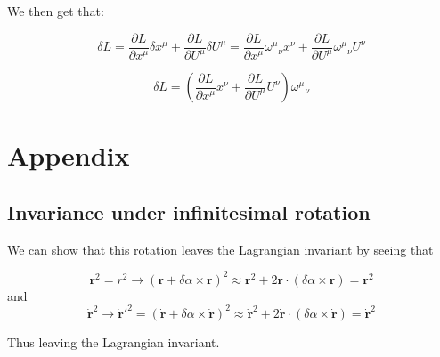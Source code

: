 \documentclass[a4paper,norsk, 10pt]{article}
\begin{document}
We then get that:

$$
\delta L = \frac{\partial L}{\partial x^{\mu}}\delta x^{\mu} + \frac{\partial L}{\partial U^{\mu}}\delta U^{\mu} = \frac{\partial L}{\partial x^{\mu}}{\omega^{\mu}}_{\nu}x^{\nu} + \frac{\partial L}{\partial U^{\mu}}{\omega^{\mu}}_{\nu}U^{\nu}
$$

\begin{equation}
\delta L = \left(\frac{\partial L}{\partial x^{\mu}}x^{\nu} + \frac{\partial L}{\partial U^{\mu}}U^{\nu}\right){\omega^{\mu}}_{\nu}
\end{equation}


\section{Appendix}

\subsection{Invariance under infinitesimal rotation}
We can show that this rotation leaves the Lagrangian invariant by seeing that

$$
\mathbf{r}^2 = r^2 \rightarrow (\mathbf{r} + \delta\alpha\times\mathbf{r})^2 \approx \mathbf{r}^2 + 2\mathbf{r}\cdot(\delta\alpha\times \mathbf{r}) = \mathbf{r}^2
$$
and
$$
\mathbf{\dot{r}}^2 \rightarrow \mathbf{\dot{r}}'^2 = (\mathbf{\dot{r}} + \delta \alpha\times \mathbf{\dot{r}})^2 \approx \mathbf{\dot{r}}^2 + 2\mathbf{\dot{r}}\cdot(\delta\alpha\times \mathbf{\dot{r}}) = \mathbf{\dot{r}}^2
$$

Thus leaving the Lagrangian invariant.
\label{subsec:invariance}
\end{document}
